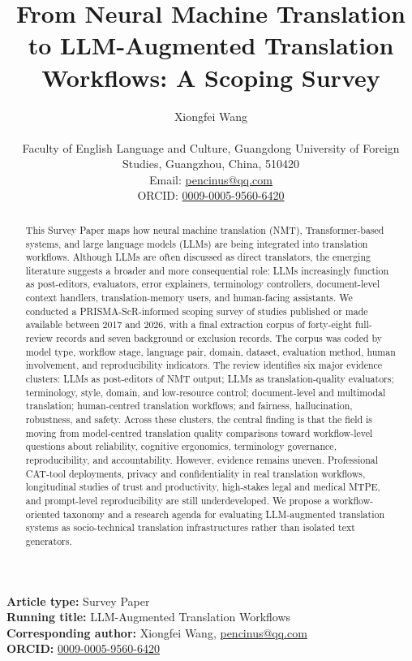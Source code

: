 \documentclass[11pt]{article}
\title{From Neural Machine Translation to LLM-Augmented Translation Workflows: A Scoping Survey}
\author{Xiongfei Wang\\[0.3em]\begin{minipage}{0.86\textwidth}\centering
Faculty of English Language and Culture, Guangdong University of Foreign Studies, Guangzhou, China, 510420\\
Email: \href{mailto:pencinus@qq.com}{pencinus@qq.com}\\
ORCID: \href{https://orcid.org/0009-0005-9560-6420}{0009-0005-9560-6420}
\end{minipage}}
\date{}
\begin{document}
\maketitle
\noindent\textbf{Article type:} Survey Paper\\
\textbf{Running title:} LLM-Augmented Translation Workflows\\
\textbf{Corresponding author:} Xiongfei Wang, \href{mailto:pencinus@qq.com}{pencinus@qq.com}\\
\textbf{ORCID:} \href{https://orcid.org/0009-0005-9560-6420}{0009-0005-9560-6420}

\begin{abstract}
This Survey Paper maps how neural machine translation (NMT), Transformer-based systems, and large language models (LLMs) are being integrated into translation workflows. Although LLMs are often discussed as direct translators, the emerging literature suggests a broader and more consequential role: LLMs increasingly function as post-editors, evaluators, error explainers, terminology controllers, document-level context handlers, translation-memory users, and human-facing assistants. We conducted a PRISMA-ScR-informed scoping survey of studies published or made available between 2017 and 2026, with a final extraction corpus of forty-eight full-review records and seven background or exclusion records. The corpus was coded by model type, workflow stage, language pair, domain, dataset, evaluation method, human involvement, and reproducibility indicators. The review identifies six major evidence clusters: LLMs as post-editors of NMT output; LLMs as translation-quality evaluators; terminology, style, domain, and low-resource control; document-level and multimodal translation; human-centred translation workflows; and fairness, hallucination, robustness, and safety. Across these clusters, the central finding is that the field is moving from model-centred translation quality comparisons toward workflow-level questions about reliability, cognitive ergonomics, terminology governance, reproducibility, and accountability. However, evidence remains uneven. Professional CAT-tool deployments, privacy and confidentiality in real translation workflows, longitudinal studies of trust and productivity, high-stakes legal and medical MTPE, and prompt-level reproducibility are still underdeveloped. We propose a workflow-oriented taxonomy and a research agenda for evaluating LLM-augmented translation systems as socio-technical translation infrastructures rather than isolated text generators.
\end{abstract}
\end{document}
